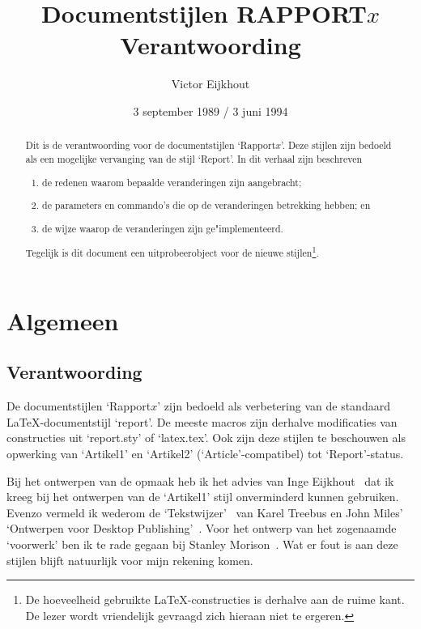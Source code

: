 \documentclass[oldtoc,a4paper,10pt]{rapport3}
\begin{document}
\date{3 september 1989 / 3 juni 1994}
\title{Documentstijlen RAPPORT$x$\\
  Verantwoording}
\author{Victor Eijkhout}
\maketitle
 
\begin{abstract}
  Dit is de verantwoording voor de documentstijlen `Rapport$x$'.  Deze
  stijlen zijn bedoeld als een mogelijke vervanging van de stijl
  `Report'. In dit verhaal zijn beschreven
\begin{enumerate}
\item de redenen waarom bepaalde veranderingen zijn aangebracht;
\item de parameters en commando's die op de veranderingen betrekking
  hebben; en
\item de wijze waarop de veranderingen zijn ge"implementeerd.
\end{enumerate}
Tegelijk is dit document een uitprobeerobject voor de nieuwe
stijlen\footnote{De hoeveelheid gebruikte \LaTeX-constructies is
  derhalve aan de ruime kant. De lezer wordt vriendelijk gevraagd zich
  hieraan niet te ergeren.}.
\end{abstract}
 
\tableofcontents
\listoftables
\listoffigures
 
\part{Algemeen}
 
\chapter{Verantwoording}
 
De documentstijlen `Rapport$x$' zijn bedoeld als verbetering van de
standaard \LaTeX-document\-stijl `report'. De meeste macros zijn
derhalve modificaties van constructies uit `report.sty' of
`latex.tex'.  Ook zijn deze stijlen te beschouwen als opwerking van
`Artikel1' en `Artikel2' (`Article'-compatibel) tot `Report'-status.
 
Bij het ontwerpen van de opmaak heb ik het advies van Inge
Eijkhout~\cite{Inge} dat ik kreeg bij het ontwerpen van de `Artikel1'
stijl onverminderd kunnen gebruiken.  Evenzo vermeld ik wederom de
`Tekstwijzer'~\cite{Treebus} van Karel Treebus en John Miles'
`Ontwerpen voor Desktop Publishing'~\cite{Miles}.  Voor het ontwerp
van het zogenaamde `voorwerk' ben ik te rade gegaan bij Stanley
Morison~\cite{Morison}.  Wat er fout is aan deze stijlen blijft
natuurlijk voor mijn rekening komen.
 
\end{document}
